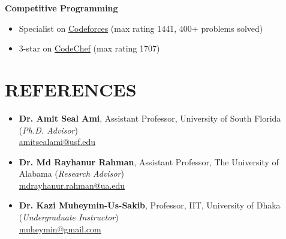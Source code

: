 \documentclass[11pt, letterpaper]{article}
\newcommand{\subheading}[1]{\vspace{0.12cm}\textbf{#1}\par\vspace{0.02cm}}
\begin{document}
\subheading{Competitive Programming}
\begin{itemize}
    \item Specialist on \href{https://codeforces.com/profile/abir_ashhab}{Codeforces} (max rating 1441, 400+ problems solved)
    \item 3-star on \href{https://www.codechef.com/users/abir_ashab}{CodeChef} (max rating 1707)
\end{itemize}

\section{REFERENCES}

\begin{itemize}
    \item \textbf{Dr. Amit Seal Ami}, Assistant Professor, University of South Florida (\textit{Ph.D. Advisor})\\
        \href{mailto:amitsealami@usf.edu}{amitsealami@usf.edu}
    \item \textbf{Dr. Md Rayhanur Rahman}, Assistant Professor, The University of Alabama (\textit{Research Advisor})\\
        \href{mailto:mdrayhanur.rahman@ua.edu}{mdrayhanur.rahman@ua.edu}
    \item \textbf{Dr. Kazi Muheymin-Us-Sakib}, Professor, IIT, University of Dhaka (\textit{Undergraduate Instructor})\\
        \href{mailto:muheymin@gmail.com}{muheymin@gmail.com}
\end{itemize}
\end{document}
